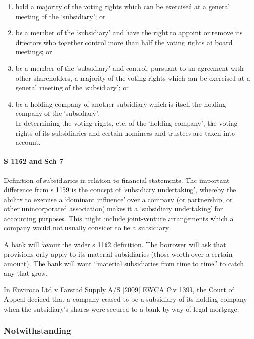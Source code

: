 \documentclass[
]{article}
\providecommand{\tightlist}{%
  \setlength{\itemsep}{0pt}\setlength{\parskip}{0pt}}
\begin{document}
\begin{enumerate}
\tightlist
\item
  hold a majority of the voting rights which can be exercised at a
  general meeting of the `subsidiary'; or
\item
  be a member of the `subsidiary' and have the right to appoint or
  remove its directors who together control more than half the voting
  rights at board meetings; or
\item
  be a member of the `subsidiary' and control, pursuant to an agreement
  with other shareholders, a majority of the voting rights which can be
  exercised at a general meeting of the `subsidiary'; or
\item
  be a holding company of another subsidiary which is itself the holding
  company of the `subsidiary'.\\
  In determining the voting rights, etc, of the `holding company', the
  voting rights of its subsidiaries and certain nominees and trustees
  are taken into account.
\end{enumerate}

\hypertarget{s-1162-and-sch-7}{%
\paragraph{S 1162 and Sch 7}\label{s-1162-and-sch-7}}

Definition of subsidiaries in relation to financial statements. The
important difference from s 1159 is the concept of `subsidiary
undertaking', whereby the ability to exercise a `dominant influence'
over a company (or partnership, or other unincorporated association)
makes it a `subsidiary undertaking' for accounting purposes. This might
include joint-venture arrangements which a company would not usually
consider to be a subsidiary.

A bank will favour the wider s 1162 definition. The borrower will ask
that provisions only apply to its material subsidiaries (those worth
over a certain amount). The bank will want ``material subsidiaries from
time to time'' to catch any that grow.

In Enviroco Ltd v Farstad Supply A/S {[}2009{]} EWCA Civ 1399, the Court
of Appeal decided that a company ceased to be a subsidiary of its
holding company when the subsidiary's shares were secured to a bank by
way of legal mortgage.

\hypertarget{notwithstanding}{%
\subsubsection{Notwithstanding}\label{notwithstanding}}
\end{document}
